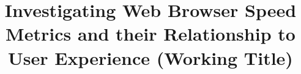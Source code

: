 \documentclass[conference]{IEEEtran}
\begin{document}

\title{Investigating Web Browser Speed Metrics and their Relationship to User Experience
 (Working Title)}


\maketitle




\IEEEpeerreviewmaketitle





\printbibliography 
\end{document}
